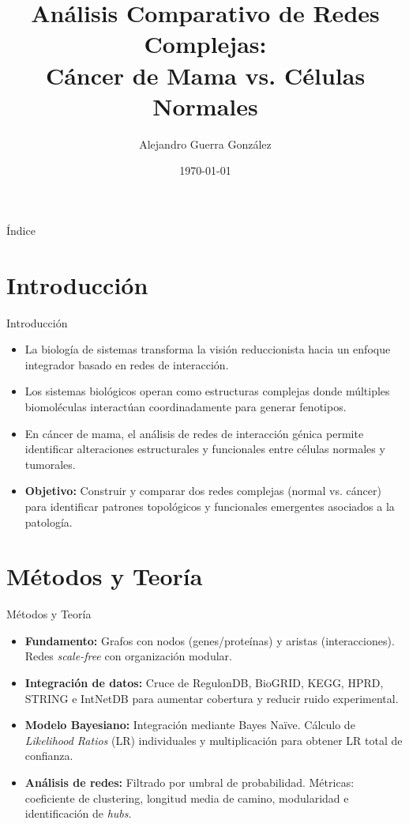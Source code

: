 \documentclass[12pt]{beamer}
\title[Redes Complejas: Cáncer vs Normal]{Análisis Comparativo de Redes Complejas:\\Cáncer de Mama vs. Células Normales}
\author[A. Guerra González]{Alejandro Guerra González}
\institute[FCQ-UASLP]{
	Maestría en Ciencia en Ingeniería Química\\
	Facultad de Ciencias Químicas\\
	Universidad Autónoma de San Luis Potosí
}
\date{\today}
\begin{document}
	
	\begin{frame}
		\titlepage
	\end{frame}
	
	\begin{frame}{Índice}
		\tableofcontents
	\end{frame}
	
	\section{Introducción}
	\begin{frame}{Introducción}
		\begin{itemize}
			\item La biología de sistemas transforma la visión reduccionista hacia un enfoque integrador basado en redes de interacción.
			\item Los sistemas biológicos operan como estructuras complejas donde múltiples biomoléculas interactúan coordinadamente para generar fenotipos.
			\item En cáncer de mama, el análisis de redes de interacción génica permite identificar alteraciones estructurales y funcionales entre células normales y tumorales.
			\item \textbf{Objetivo:} Construir y comparar dos redes complejas (normal vs. cáncer) para identificar patrones topológicos y funcionales emergentes asociados a la patología.
		\end{itemize}
	\end{frame}
	
	\section{Métodos y Teoría}
	\begin{frame}{Métodos y Teoría}
		\begin{itemize}
			\item \textbf{Fundamento:} Grafos con nodos (genes/proteínas) y aristas (interacciones). Redes \textit{scale-free} con organización modular.
			\item \textbf{Integración de datos:} Cruce de RegulonDB, BioGRID, KEGG, HPRD, STRING e IntNetDB para aumentar cobertura y reducir ruido experimental.
			\item \textbf{Modelo Bayesiano:} Integración mediante Bayes Naïve. Cálculo de \textit{Likelihood Ratios} (LR) individuales y multiplicación para obtener LR total de confianza.
			\item \textbf{Análisis de redes:} Filtrado por umbral de probabilidad. Métricas: coeficiente de clustering, longitud media de camino, modularidad e identificación de \textit{hubs}.
		\end{itemize}
	\end{frame}
	
\end{document}

